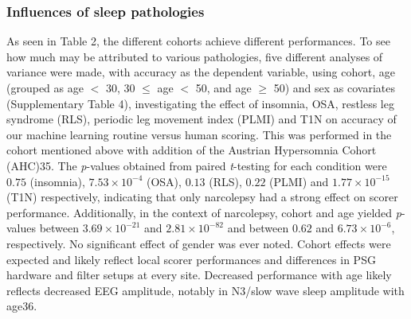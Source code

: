 
\subsubsection{Influences of sleep pathologies}
As seen in Table 2, the different cohorts achieve different performances.
To see how much may be attributed to various pathologies, five different analyses of variance were made, with accuracy as the dependent variable, using cohort, age (grouped as age $<$ 30, 30 $\leq$ age $<$ 50, and age $\geq$ 50) and sex as covariates (Supplementary Table 4), investigating the effect of insomnia, OSA, restless leg syndrome (RLS), periodic leg movement index (PLMI) and T1N on accuracy of our machine learning routine versus human scoring. 
This was performed in the cohort mentioned above with addition of the Austrian Hypersomnia Cohort (AHC)35. 
The \textit{p}-values obtained from paired \textit{t}-testing for each condition were $0.75$ (insomnia), $7.53 \times 10^{-4}$ (OSA), $0.13$ (RLS), $0.22$ (PLMI) and $1.77 \times 10^{-15}$ (T1N) respectively, indicating that only narcolepsy had a strong effect on scorer performance. 
Additionally, in the context of narcolepsy, cohort and age yielded \textit{p}-values between $3.69 \times 10^{-21}$ and $2.81 \times 10^{-82}$ and between $0.62$ and $6.73 \times 10^{-6}$, respectively. 
No significant effect of gender was ever noted. 
Cohort effects were expected and likely reflect local scorer performances and differences in PSG hardware and filter setups at every site. 
Decreased performance with age likely reflects decreased EEG amplitude, notably in N3/slow wave sleep amplitude with age36.

